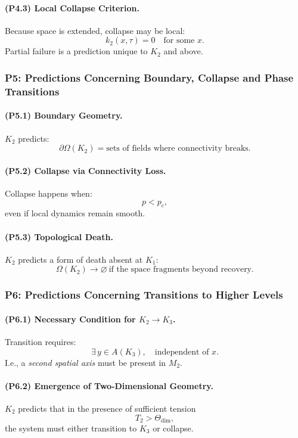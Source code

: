 \paragraph{(P4.3) Local Collapse Criterion.}
Because space is extended, collapse may be local:
\[
k_2(x,\tau) = 0 \quad \text{for some } x.
\]
Partial failure is a prediction unique to $K_2$ and above.

\subsubsection{P5: Predictions Concerning Boundary, Collapse and Phase Transitions}

\paragraph{(P5.1) Boundary Geometry.}
$K_2$ predicts:
\[
\partial\Omega(K_2) = \text{sets of fields where connectivity breaks}.
\]

\paragraph{(P5.2) Collapse via Connectivity Loss.}
Collapse happens when:
\[
p < p_c,
\]
even if local dynamics remain smooth.

\paragraph{(P5.3) Topological Death.}
$K_2$ predicts a form of death absent at $K_1$:
\[
\Omega(K_2) \to \varnothing
\ \text{if the space fragments beyond recovery}.
\]

\subsubsection{P6: Predictions Concerning Transitions to Higher Levels}

\paragraph{(P6.1) Necessary Condition for \texorpdfstring{$K_2\to K_3$}{K_2\to K_3}.}
Transition requires:
\[
\exists\, y \in A(K_3), \quad \text{independent of } x.
\]
I.e., a \emph{second spatial axis} must be present in $M_2$.

\paragraph{(P6.2) Emergence of Two-Dimensional Geometry.}
$K_2$ predicts that in the presence of sufficient tension
\[
T_2 > \Theta_{\mathrm{dim}},
\]
the system must either transition to $K_3$ or collapse.

